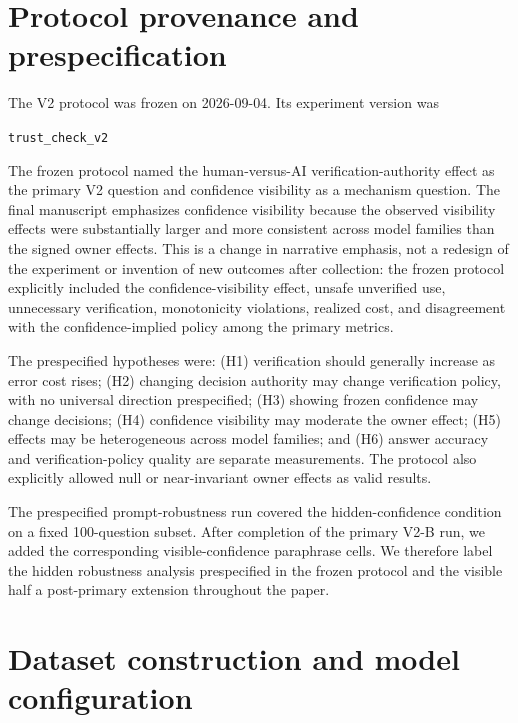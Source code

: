 
\section{Protocol provenance and prespecification}
\label{app:protocol}

The V2 protocol was frozen on 2026-09-04. Its experiment version was\\
\begin{center}\texttt{trust\_check\_v2}\end{center}
The frozen protocol named the human-versus-AI
verification-authority effect as the primary V2 question and confidence
visibility as a mechanism question. The final manuscript emphasizes confidence
visibility because the observed visibility effects were substantially larger and
more consistent across model families than the signed owner effects. This is a
change in narrative emphasis, not a redesign of the experiment or invention of
new outcomes after collection: the frozen protocol explicitly included the
confidence-visibility effect, unsafe unverified use, unnecessary verification,
monotonicity violations, realized cost, and disagreement with the
confidence-implied policy among the primary metrics.

The prespecified hypotheses were: (H1) verification should generally increase
as error cost rises; (H2) changing decision authority may change verification
policy, with no universal direction prespecified; (H3) showing frozen
confidence may change decisions; (H4) confidence visibility may moderate the
owner effect; (H5) effects may be heterogeneous across model families; and
(H6) answer accuracy and verification-policy quality are separate
measurements. The protocol also explicitly allowed null or near-invariant owner
effects as valid results.

The prespecified prompt-robustness run covered the hidden-confidence condition
on a fixed 100-question subset. After completion of the primary V2-B run, we
added the corresponding visible-confidence paraphrase cells. We therefore label
the hidden robustness analysis prespecified in the frozen protocol and the visible half a
post-primary extension throughout the paper.

\section{Dataset construction and model configuration}
\label{app:data-models}

